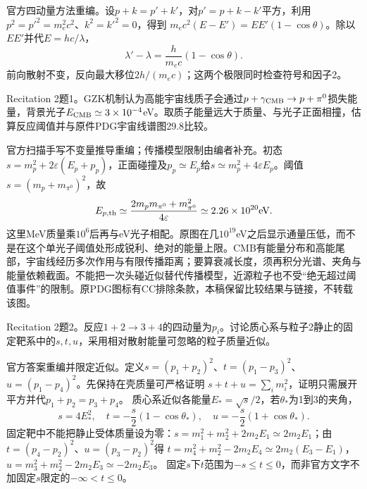 \begin{solution}
官方四动量方法重编。设$p+k=p'+k'$，对$p'=p+k-k'$平方，利用$p^2=p'^2=m_e^2c^2$、$k^2=k'^2=0$，得到
$m_ec^2(E-E')=EE'(1-\cos\theta)$。除以$EE'$并代$E=hc/\lambda$，
\begin{equation}\lambda'-\lambda=\frac{h}{m_ec}(1-\cos\theta).\end{equation}
前向散射不变，反向最大移位$2h/(m_ec)$；这两个极限同时检查符号和因子2。
\end{solution}
\begin{exercise}\label{ex:rec-2-1}
Recitation 2题1。GZK机制认为高能宇宙线质子会通过$p+\gamma_{\rm CMB}\to p+\pi^0$损失能量，背景光子$E_{\rm CMB}\simeq3\times10^{-4}$eV。取质子能量远大于质量、与光子正面相撞，估算反应阈值并与原件PDG宇宙线谱图29.8比较。
\end{exercise}
\begin{solution}
官方扫描手写不变量推导重编；传播模型限制由编者补充。初态
$s=m_p^2+2\varepsilon(E_p+p_p)$，正面碰撞及$p_p\simeq E_p$给$s\simeq m_p^2+4\varepsilon E_p$。阈值$s=(m_p+m_{\pi^0})^2$，故
\begin{equation}
 E_{p,\rm th}\simeq\frac{2m_pm_{\pi^0}+m_{\pi^0}^2}{4\varepsilon}
 \simeq2.26\times10^{20}\mathrm{eV}.
\end{equation}
这里MeV质量乘$10^6$后再与eV光子相配。原图在几$10^{19}$eV之后显示通量压低，而不是在这个单光子阈值处形成锐利、绝对的能量上限。CMB有能量分布和高能尾部，宇宙线经历多次作用与有限传播距离；要算衰减长度，须再积分光谱、夹角与能量依赖截面。不能把一次头碰近似替代传播模型，近源粒子也不受“绝无超过阈值事件”的限制。原PDG图标有CC排除条款，本稿保留比较结果与链接，不转载该图。
\end{solution}
\begin{exercise}\label{ex:rec-2-2}
Recitation 2题2。反应$1+2\to3+4$的四动量为$p_i$。讨论质心系与粒子2静止的固定靶系中的$s,t,u$，采用相对散射能量可忽略的粒子质量近似。
\end{exercise}
\begin{solution}
官方答案重编并限定近似。定义$s=(p_1+p_2)^2$、$t=(p_1-p_3)^2$、$u=(p_1-p_4)^2$。先保持在壳质量可严格证明
$s+t+u=\sum_i m_i^2$，证明只需展开平方并代$p_1+p_2=p_3+p_4$。
质心系近似各能量$E_*=\sqrt s/2$，若$\theta_*$为1到3的夹角，
\begin{equation}
 s=4E_*^2,\quad t=-\frac s2(1-\cos\theta_*),\quad
 u=-\frac s2(1+\cos\theta_*).
\end{equation}
固定靶中不能把静止受体质量设为零：$s=m_1^2+m_2^2+2m_2E_1\simeq2m_2E_1$；由$t=(p_4-p_2)^2$、$u=(p_3-p_2)^2$得
$t=m_4^2+m_2^2-2m_2E_4\simeq2m_2(E_3-E_1)$，
$u=m_3^2+m_2^2-2m_2E_3\simeq-2m_2E_3$。
固定$s$下$t$范围为$-s\le t\le0$，而非官方文字不加固定$s$限定的$-\infty<t\le0$。
\end{solution}
